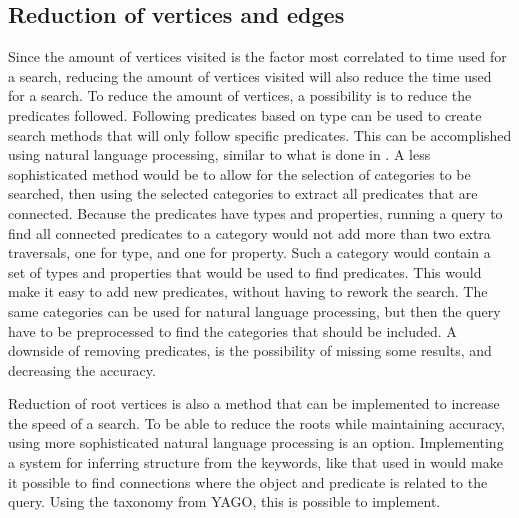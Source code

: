 \subsection{Reduction of vertices and edges}
Since the amount of vertices visited is the factor most correlated to time used for a search, reducing the amount of vertices visited will also reduce the time used for a search. To reduce the amount of vertices, a possibility is to reduce the predicates followed. Following predicates based on type can be used to create search methods that will only follow specific predicates. This can be accomplished using natural language processing, similar to what is done in \cite{4812421,aqualog}. A less sophisticated method would be to allow for the selection of categories to be searched, then using the selected categories to extract all predicates that are connected. Because the predicates have types and properties, running a query to find all connected predicates to a category would not add more than two extra traversals, one for type, and one for property. Such a category would contain a set of types and properties that would be used to find predicates. This would make it easy to add new predicates, without having to rework the search. The same categories can be used for natural language processing, but then the query have to be preprocessed to find the categories that should be included. A downside of removing predicates, is the possibility of missing some results, and decreasing the accuracy.

Reduction of root vertices is also a method that can be implemented to increase the speed of a search. To be able to reduce the roots while maintaining accuracy, using more sophisticated natural language processing is an option. Implementing a system for inferring structure from the keywords, like that used in \cite{Elbassuoni:2011:KSO:2063576.2063615} would make it possible to find connections where the object and predicate is related to the query. Using the taxonomy from YAGO, this is possible to implement.

